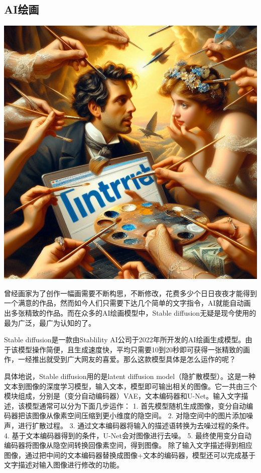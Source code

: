 \subsection{AI绘画}
\begin{marginfigure}
    \includegraphics{images/Internet_01.jpg}
\end{marginfigure}
曾经画家为了创作一幅画需要不断构思，不断修改，花费多少个日日夜夜才能得到一个满意的作品，然而如今人们只需要下达几个简单的文字指令，AI就能自动画出多张精致的作品。而在众多的AI绘画模型中，Stable diffusion无疑是现今使用的最为广泛，最广为认知的了。

Stable diffusion是一款由Stablility AI公司于2022年所开发的AI绘画生成模型。由于该模型操作简便，且生成速度快，平均只需要10到20秒即可获得一张精致的画作，一经推出就受到广大网友的喜爱。那么这款模型具体是怎么运作的呢？

具体地说，Stable diffusion用的是latent diffusion model（隐扩散模型）。这是一种文本到图像的深度学习模型，输入文本，模型即可输出相关的图像。它一共由三个模块组成，分别是（变分自动编码器）VAE，文本编码器和U-Net。输入文字描述，该模型通常可以分为下面几步运作：
1. 首先模型随机生成图像，变分自动编码器把该图像从像素空间压缩到更小维度的隐空间。
2. 对隐空间中的图片添加噪声，进行扩散过程。
3. 通过文本编码器将输入的描述语转换为去噪过程的条件。
4. 基于文本编码器得到的条件，U-Net会对图像进行去噪。
5. 最终使用变分自动编码器将图像从隐空间转换回像素空间，得到图像。
除了输入文字描述得到相应图像，通过把中间的文本编码器替换成图像+文本的编码器，模型还可以完成基于文字描述对输入图像进行修改的功能。

